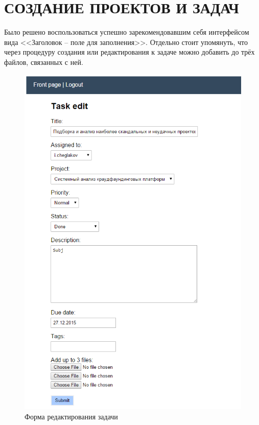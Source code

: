 \documentclass[14pt, a4paper]{extreport}
\begin{document}
\section{\MakeTextUppercase{Создание проектов и задач}}
Было решено воспользоваться успешно зарекомендовавшим себя интерфейсом вида <<Заголовок -- поле для заполнения>>. Отдельно стоит упомянуть, что через процедуру создания или редактирования к задаче можно добавить до трёх файлов, связанных с ней.

\begin{figure}[!htb]
  \centering
    \includegraphics[scale=0.4]{../shared_images/frontend/task-edit.png}
   \caption{Форма редактирования задачи}
    \label{fig:start}
\end{figure}
\end{document}
